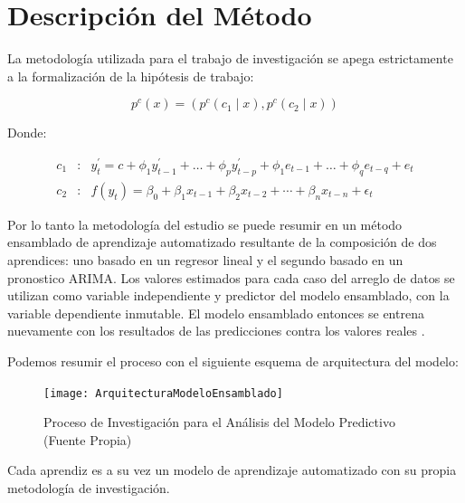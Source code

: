 \section{Descripción del Método}
La metodología utilizada para el trabajo de investigación se apega estrictamente a la formalización de la hipótesis de trabajo:

\begin{equation}
    p^{c}(x) = (p^{c}(c_{1} \mid x),p^{c}(c_{2} \mid x))
\end{equation}

Donde:

\begin{eqnarray}
    c_{1} & : & y_{t}^{\prime} = c + \phi_{1}y_{t-1}^{\prime} + \ldots + \phi_{p}y_{t-p}^{\prime} + \phi_{1}e_{t-1} + \ldots + \phi_{q}e_{t-q} + e_{t} \\
    c_{2} & : & f(y_{t}) = \beta_{0} + \beta_{1}x_{t-1} + \beta_{2}x_{t-2} + \cdots + \beta_{n}x_{t-n} + \epsilon_{t}
\end{eqnarray}

Por lo tanto la metodología del estudio se puede resumir en un método ensamblado de aprendizaje automatizado resultante de la composición de dos aprendices: uno basado en un regresor lineal y el segundo basado en un pronostico ARIMA. Los valores estimados para cada caso del arreglo de datos se utilizan como variable independiente y predictor del modelo ensamblado, con la variable dependiente inmutable. El modelo ensamblado entonces se entrena nuevamente con los resultados de las predicciones contra los valores reales \cite{leek}.   

Podemos resumir el proceso con el siguiente esquema de arquitectura del modelo:

\begin{figure}[h!]
    \centering
    \texttt{[image: ArquitecturaModeloEnsamblado]}
    \caption{Proceso de Investigación para el Análisis del Modelo Predictivo (Fuente Propia)}
\end{figure}

Cada aprendiz es a su vez un modelo de aprendizaje automatizado con su propia metodología de investigación. 

